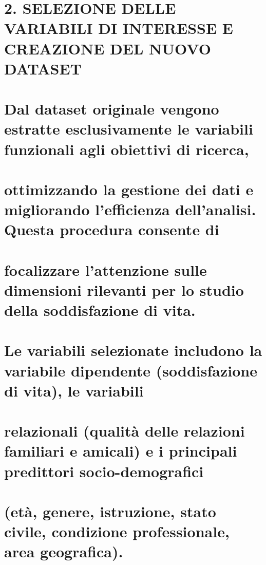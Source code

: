 \documentclass[
]{article}
\begin{document}
\section{2. SELEZIONE DELLE VARIABILI DI INTERESSE E CREAZIONE DEL NUOVO
DATASET}\label{selezione-delle-variabili-di-interesse-e-creazione-del-nuovo-dataset}

\section{Dal dataset originale vengono estratte esclusivamente le
variabili funzionali agli obiettivi di
ricerca,}\label{dal-dataset-originale-vengono-estratte-esclusivamente-le-variabili-funzionali-agli-obiettivi-di-ricerca}

\section{ottimizzando la gestione dei dati e migliorando l'efficienza
dell'analisi. Questa procedura consente
di}\label{ottimizzando-la-gestione-dei-dati-e-migliorando-lefficienza-dellanalisi.-questa-procedura-consente-di}

\section{focalizzare l'attenzione sulle dimensioni rilevanti per lo
studio della soddisfazione di
vita.}\label{focalizzare-lattenzione-sulle-dimensioni-rilevanti-per-lo-studio-della-soddisfazione-di-vita.}

\section{Le variabili selezionate includono la variabile dipendente
(soddisfazione di vita), le
variabili}\label{le-variabili-selezionate-includono-la-variabile-dipendente-soddisfazione-di-vita-le-variabili}

\section{relazionali (qualità delle relazioni familiari e amicali) e i
principali predittori
socio-demografici}\label{relazionali-qualituxe0-delle-relazioni-familiari-e-amicali-e-i-principali-predittori-socio-demografici}

\section{(età, genere, istruzione, stato civile, condizione
professionale, area
geografica).}\label{etuxe0-genere-istruzione-stato-civile-condizione-professionale-area-geografica.}
\end{document}
